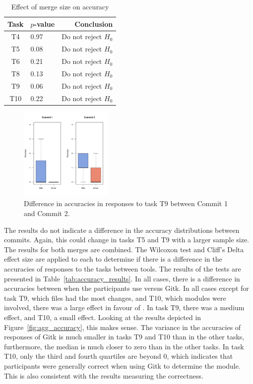\begin{table}[htpb]
  \centering
  \caption{Effect of merge size on accuracy}
  \label{tab:cross_commit_accuracy}
  \begin{tabular}{clr}
    \toprule
    Task & $p$-value & Conclusion\\\midrule
    T4   & 0.97      & Do not reject $H_0$\\
    T5   & 0.08      & Do not reject $H_0$\\
    T6   & 0.21      & Do not reject $H_0$\\
    T8   & 0.13      & Do not reject $H_0$\\
    T9   & 0.06      & Do not reject $H_0$\\
    T10  & 0.22      & Do not reject $H_0$\\
    \bottomrule
  \end{tabular}
\end{table}

\begin{figure}[htpb]
  \centering
  \includegraphics[height=4.5cm]{Figures/evaluation/accuracy/9.pdf}
  \caption{Difference in accuracies in responses to task T9 between Commit 1 and Commit 2.}
  \label{fig:cross_commit_T9_accuracy}
\end{figure}

The results do not indicate a difference in the accuracy distributions
between commits. Again, this could change in tasks T5 and T9 with a
larger sample size. The results for both merges are combined. The
Wilcoxon test and Cliff's Delta effect size are applied to each to
determine if there is a difference in the accuracies of responses to the
tasks between tools. The results of the tests are presented in
Table~\ref{tab:accuracy_results}. In all cases, there is a difference
in accuracies between when the participants use \tool{} versus Gitk. In
all cases except for task T9, which files had the most changes, and T10,
which modules were involved, there was a large effect in favour of
\tool{}. In task T9, there was a medium effect, and T10, a small effect.
Looking at the results depicted in Figure~\ref{fig:agg_accuracy}, this
makes sense. The variance in the accuracies of responses of Gitk is much
smaller in tasks T9 and T10 than in the other tasks, furthermore, the
median is much closer to zero than in the other tasks. In task T10, only
the third and fourth quartiles are beyond 0, which indicates that
participants were generally correct when using Gitk to determine the
module. This is also consistent with the results measuring the
correctness.

